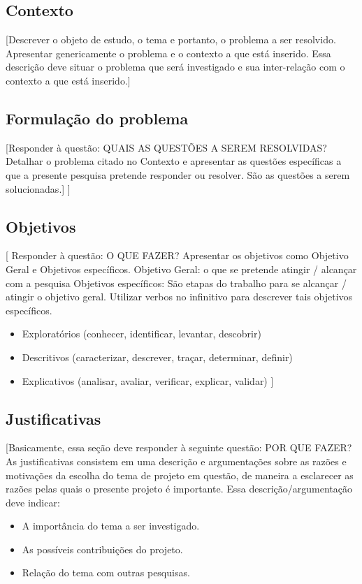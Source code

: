 
\subsection{Contexto} %
\label{sub:contexto}

[Descrever o objeto de estudo, o tema e portanto, o problema a ser resolvido. Apresentar genericamente o problema e o contexto a que está inserido. Essa descrição deve situar o problema que será investigado e sua inter-relação com o contexto a que está inserido.]

\subsection{Formulação do problema} %
\label{sub:formula_o_do_problema}

[Responder à questão: QUAIS AS QUESTÕES A SEREM RESOLVIDAS?
Detalhar o problema citado no Contexto e apresentar as questões específicas a que a presente pesquisa pretende responder ou resolver. São as questões a serem solucionadas.]
]

\subsection{Objetivos} %
\label{sub:objetivos}

[ Responder à questão: O QUE FAZER?
Apresentar os objetivos como Objetivo Geral e Objetivos específicos.
Objetivo Geral: o que se pretende atingir / alcançar com a pesquisa
Objetivos específicos: São etapas do trabalho para se alcançar / atingir o objetivo geral. Utilizar verbos no infinitivo para descrever tais objetivos específicos.
\begin{itemize}
	\item Exploratórios (conhecer, identificar, levantar, descobrir)
	\item Descritivos (caracterizar, descrever, traçar, determinar, definir)
	\item Explicativos (analisar, avaliar, verificar, explicar, validar)   ]
\end{itemize}


\subsection{Justificativas} %
\label{sub:justificativas}

[Basicamente, essa seção deve responder à seguinte questão: POR QUE FAZER?
As justificativas consistem em uma descrição e argumentações sobre as razões e motivações da escolha do tema de projeto em questão, de maneira a esclarecer as razões pelas quais o presente projeto é importante.
Essa descrição/argumentação deve indicar:
\begin{itemize}
	\item A importância do tema a ser investigado.
	\item As possíveis contribuições do projeto.
	\item Relação do tema com outras pesquisas.
\end{itemize}
